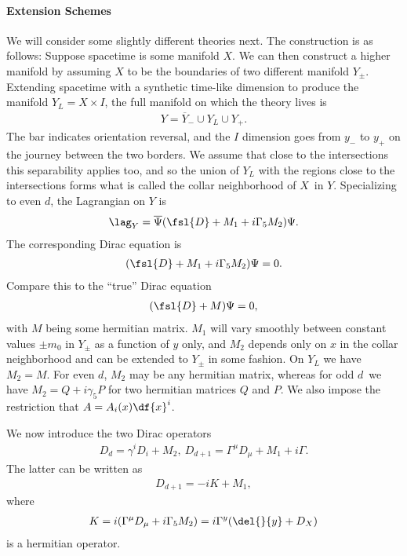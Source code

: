 \paragraph{Extension Schemes}
We will consider some slightly different theories next. The construction is as follows: Suppose spacetime is some manifold $X$. We can then construct a higher manifold by assuming $X$ to be the boundaries of two different manifold $Y_{\pm}$. Extending spacetime with a synthetic time-like dimension to produce the manifold $Y_{L} = X\times I$, the full manifold on which the theory lives is
\begin{align*}
	Y = \overline{Y}_{-}\cup Y_{L}\cup Y_{+}.
\end{align*}
The bar indicates orientation reversal, and the $I$ dimension goes from $y_{-}$ to $y_{+}$ on the journey between the two borders. We assume that close to the intersections this separability applies too, and so the union of $Y_{L}$ with the regions close to the intersections forms what is called the collar neighborhood of $X$ in $Y$. Specializing to even $d$, the Lagrangian on $Y$ is
\begin{align*}
	\lag_{Y} = \overline{\Psi}(\fsl{D} + M_{1} + i\Gamma_{5}M_{2})\Psi.
\end{align*}
The corresponding Dirac equation is
\begin{align*}
	(\fsl{D} + M_{1} + i\Gamma_{5}M_{2})\Psi = 0.
\end{align*}
Compare this to the ``true'' Dirac equation
\begin{align*}
	(\fsl{D} + M)\Psi = 0,
\end{align*}
with $M$ being some hermitian matrix. $M_{1}$ will vary smoothly between constant values $\pm m_{0}$ in $Y_{\pm}$ as a function of $y$ only, and $M_{2}$ depends only on $x$ in the collar neighborhood and can be extended to $Y_{\pm}$ in some fashion. On $Y_{L}$ we have $M_{2} = M$. For even $d$, $M_{2}$ may be any hermitian matrix, whereas for odd $d$ we have $M_{2} = Q + i\gamma_{5}P$ for two hermitian matrices $Q$ and $P$. We also impose the restriction that $A = A_{i}(x)\df{x}^{i}$.

We now introduce the two Dirac operators
\begin{align*}
	D_{d} = \gamma^{i}D_{i} + M_{2},\ D_{d + 1} = \Gamma^{\mu}D_{\mu} + M_{1} + i\Gamma.
\end{align*}
The latter can be written as
\begin{align*}
	D_{d + 1} = -iK + M_{1},
\end{align*}
where
\begin{align*}
	K = i(\Gamma^{\mu}D_{\mu} + i\Gamma_{5}M_{2}) = i\Gamma^{y}(\del{}{y} + D_{X})
\end{align*}
is a hermitian operator.

